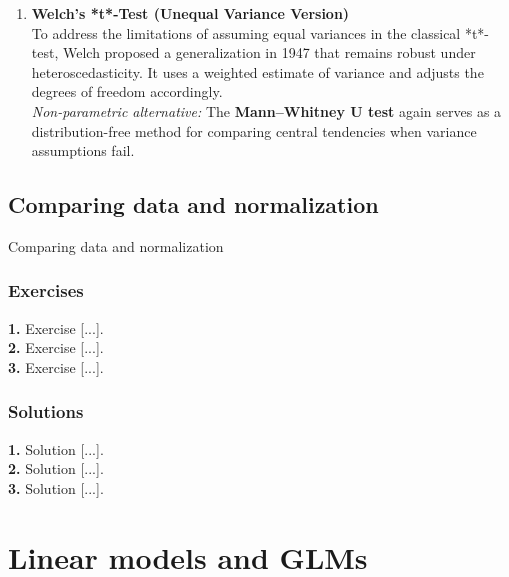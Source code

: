 \documentclass{book}
\begin{document}
\begin{enumerate}
\item \textbf{Welch’s *t*-Test (Unequal Variance Version)}\\
To address the limitations of assuming equal variances in the classical *t*-test, Welch proposed a generalization in 1947 \cite{welch1947} that remains robust under heteroscedasticity. It uses a weighted estimate of variance and adjusts the degrees of freedom accordingly.\\
\textit{Non-parametric alternative:} The \textbf{Mann–Whitney U test} again serves as a distribution-free method for comparing central tendencies when variance assumptions fail.

\end{enumerate}

\newpage

\section{Comparing data and normalization}

Comparing data and normalization

\newpage

\subsection*{Exercises}

\textbf{1.} Exercise [...].\\

\textbf{2.} Exercise [...].\\

\textbf{3.} Exercise [...].\\

\newpage

\subsection*{Solutions}

\textbf{1.} Solution [...].\\

\textbf{2.} Solution [...].\\

\textbf{3.} Solution [...].\\



\chapter{Linear models and GLMs}
\end{document}
